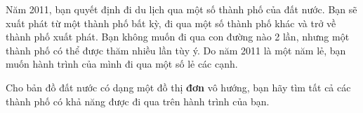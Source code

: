 Năm 2011, bạn quyết định đi du lịch qua một số thành phố của đất nước. Bạn sẽ xuất phát từ một thành phố bất kỳ, đi qua một số thành phố khác và trở về thành phố xuất phát. Bạn không muốn đi qua con đường nào 2 lần, nhưng một thành phố có thể được thăm nhiều lần tùy ý. Do năm 2011 là một năm lẻ, bạn muốn hành trình của mình đi qua một số lẻ các cạnh.   





   Cho bản đồ đất nước có dạng một đồ thị   \textbf{    đơn   }   vô hướng, bạn hãy tìm tất cả các thành phố có khả năng được đi qua trên hành trình của bạn.